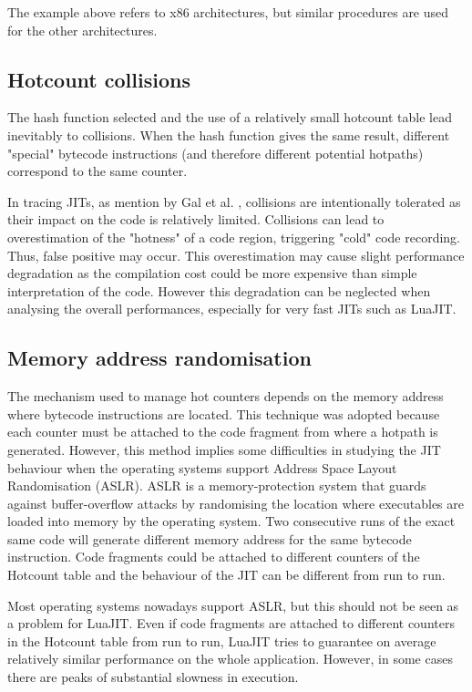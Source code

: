 The example above refers to x86 architectures, but similar procedures are used for the other architectures.

\subsection{Hotcount collisions}

The hash function selected  and the use of a relatively small hotcount table lead inevitably to collisions. When the hash function gives the same result, different "special" bytecode instructions (and therefore different potential hotpaths) correspond to the same counter.

In tracing JITs, as mention by Gal et al. \cite{gal2006hotpathvm}, collisions are intentionally tolerated as their impact on the code is relatively limited. Collisions can lead to overestimation of the "hotness" of a code region, triggering "cold" code recording. Thus, false positive may occur. This overestimation may cause slight performance degradation as the compilation cost could be more expensive than simple interpretation of the code. However this degradation can be neglected when analysing the overall performances, especially for very fast JITs such as LuaJIT.

\subsection{Memory address randomisation}
The mechanism used to manage hot counters depends on the memory address where bytecode instructions are located. This technique was adopted because each counter must be attached to the code fragment from where a hotpath is generated. However, this method implies some difficulties in studying the JIT behaviour when the operating systems support Address Space Layout Randomisation (ASLR). ASLR is a memory-protection system that guards against buffer-overflow attacks by randomising the location where executables are loaded into memory by the operating system. Two consecutive runs of the exact same code will generate different memory address for the same bytecode instruction. Code fragments could be attached to different counters of the Hotcount table and the behaviour of the JIT can be different from run to run.

Most operating systems nowadays support ASLR, but this should not be seen as a problem for LuaJIT. Even if code fragments are attached to different counters in the Hotcount table from run to run, LuaJIT tries to guarantee on average relatively similar performance on the whole application. However, in some cases there are peaks of substantial slowness in execution.

